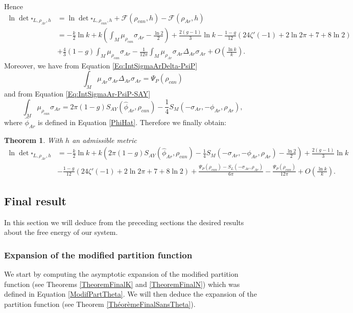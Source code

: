 \documentclass{article}
\newtheorem{theorem}{Theorem}[section]
\theoremstyle{definition}
\theoremstyle{remark}
\begin{document}
Hence 
\begin{align*}\ln\det\square_{L,\rho_{Ar},h}&=\ln\det\square_{L,\rho_{can},h}+\mathcal{F}(\rho_{can},h)-\mathcal{F}(\rho_{Ar},h)\\&=-\frac{k}{2}\ln k +k\left(\int_{M}\mu_{\rho_{can}}\sigma_{Ar}-\frac{\ln2}{2} \right)+\frac{2(g-1)}{3}\ln k- \frac{1-g}{12}(24\zeta'(-1)+2\ln2\pi+7+8\ln2)\\&+\frac{4}{3}(1-g)\int_{M}\mu_{\rho_{can}}\sigma_{Ar}-\frac{1}{12\pi}\int_{M}\mu_{\rho_{Ar}}\sigma_{Ar}\Delta_{Ar}\sigma_{Ar} +O\left(\frac{\ln k}{k} \right).
\end{align*}
Moreover, we have from Equation \eqref{Eq:IntSigmaArDelta-PsiP} $$\int_{M} \mu_{Ar} \sigma_{Ar}\Delta_{Ar}\sigma_{Ar}=\Psi_{P}(\rho_{can})$$ and from Equation \eqref{Eq:IntSigmaAr-PsiP-SAY} $$\int_{M} \mu_{\rho_{can}}\sigma_{Ar}=2\pi(1-g)S_{AY}(\hat{\phi}_{Ar},\rho_{can})-\frac{1}{4}S_{M}(-\sigma_{Ar},-\phi_{Ar},\rho_{Ar}),$$ where $\hat{\phi}_{Ar}$ is defined in Equation \eqref{PhiHat}.
Therefore we finally obtain:
\begin{theorem}\label{DevAsympLapMagAdm}
    With $h$ an admissible metric 
    \begin{align*}
        \ln\det\square_{L,\rho_{Ar},h}&=-\frac{k}{2}\ln k +k\left(2\pi(1-g)S_{AY}(\hat{\phi}_{Ar},\rho_{can})-\frac{1}{4}S_{M}(-\sigma_{Ar},-\phi_{Ar},\rho_{Ar})-\frac{\ln2}{2}\right) +\frac{2(g-1)}{3}\ln k\\&- \frac{1-g}{12}(24\zeta'(-1)+2\ln2\pi+7+8\ln2)+\frac{\Psi_{P}(\rho_{can})-S_{L}(-\sigma_{Ar},\rho_{Ar})}{6\pi}-\frac{\Psi_{P}(\rho_{can})}{12\pi} +O\left(\frac{\ln k}{k} \right).
    \end{align*}
\end{theorem}

\subsection{Final result}
In this section we will deduce from the preceding sections the desired results about the free energy of our system.
\subsubsection{Expansion of the modified partition function}
We start by computing the asymptotic expansion of the modified partition function (see Theorems \ref{TheoremFinalK} and \ref{TheoremFinalN}) which was defined in Equation \eqref{ModifPartTheta}. We will then deduce the expansion of the partition function (see Theorem \ref{ThéorèmeFinalSansTheta}).
\end{document}
